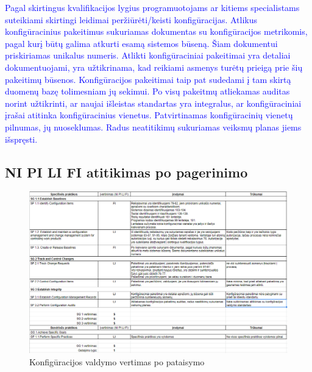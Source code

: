 \documentclass{VUMIFPSkursinis}
\begin{document}
				\textcolor{blue}{Pagal skirtingus kvalifikacijos lygius programuotojams ar kitiems specialistams suteikiami skirtingi leidimai peržiūrėti/keisti konfigūracijas. Atlikus konfigūracinius pakeitimus sukuriamas dokumentas su konfigūracijos metrikomis, pagal kurį būtų galima atkurti esamą sistemos būseną. Šiam dokumentui priskiriamas unikalus numeris.} \newline
				\textcolor{blue}{Atlikti konfigūraciniai pakeitimai yra detaliai dokumentuojami, yra užtikrinama, kad reikiami asmenys turėtų prieigą prie šių pakeitimų būsenos.} \newline
				\textcolor{blue}{Konfigūracijos pakeitimai taip pat sudedami į tam skirtą duomenų bazę tolimesniam jų sekimui.} \newline
				\textcolor{blue}{Po visų pakeitmų atliekamas auditas norint užtikrinti, ar naujai išleistas standartas yra integralus, ar konfigūraciniai įrašai atitinka konfigūracinius vienetus. Patvirtinamas konfigūracinių vienetų pilnumas, jų nuoseklumas. Radus neatitikimų sukuriamas veiksmų planas jiems išspręsti.}
		\subsection{NI PI LI FI atitikimas po pagerinimo}
		\begin{figure}[!htbp]
			\includegraphics[scale=0.6]{img/konfiguracijosValdymasPataisytas}
			\caption{Konfigūracijos valdymo vertimas po pataisymo} %
			\label{img:ProfilisPo}
		\end{figure}
\end{document}
